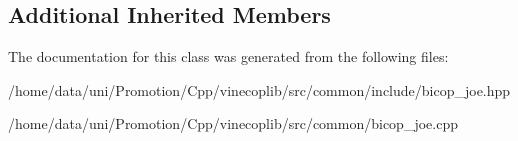 \subsection*{Additional Inherited Members}


The documentation for this class was generated from the following files\+:\begin{DoxyCompactItemize}
\item 
/home/data/uni/\+Promotion/\+Cpp/vinecoplib/src/common/include/bicop\+\_\+joe.\+hpp\item 
/home/data/uni/\+Promotion/\+Cpp/vinecoplib/src/common/bicop\+\_\+joe.\+cpp\end{DoxyCompactItemize}
